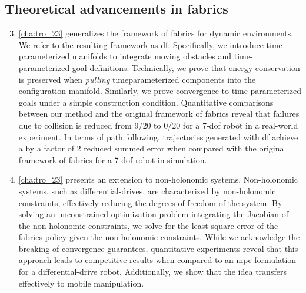 \subsection{Theoretical advancements in \ac{fabrics}}
\begin{enumerate}
    \setcounter{enumi}{2}
    \item \cref{cha:tro_23} generalizes the framework of \ac{fabrics}
      for dynamic environments. We refer to the resulting
      framework as \ac{df}. Specifically, we introduce
      time-parameterized manifolds to integrate moving
      obstacles and time-parameterized goal definitions.
      Technically,
      we prove that energy conservation is preserved when
      \textit{pulling} timeparameterized components into
      the configuration manifold. 
      Similarly, we prove convergence to
      time-parameterized goals under a simple construction
      condition. Quantitative comparisons between our method
      and the original framework of \ac{fabrics} reveal
      that failures due to collision is reduced from 9/20
      to 0/20 for a 7-\ac{dof} robot in a real-world experiment.
      In terms of path following, trajectories generated
      with \ac{df} achieve a by a factor of 2 reduced summed error 
      when compared with the original framework of
      \ac{fabrics} for a 7-\ac{dof} robot in simulation.
    \item \cref{cha:tro_23} presents an extension to
      non-holonomic systems. Non-holonomic systems, such as
      differential-drives, are characterized by
      non-holonomic constraints, effectively reducing the
      degrees of freedom of the system. By solving an
      unconstrained optimization problem integrating the
      Jacobian of the non-holonomic constraints, we solve
      for the least-square error of the \ac{fabrics} policy
      given the non-holonomic constraints. While we
      acknowledge the breaking of convergence guarantees,
      quantitative experiments reveal that this approach leads to
      competitive results when compared to an \ac{mpc}
      formulation for a differential-drive robot.
      Additionally, we show that the idea transfers effectively
      to mobile manipulation.
\end{enumerate}

